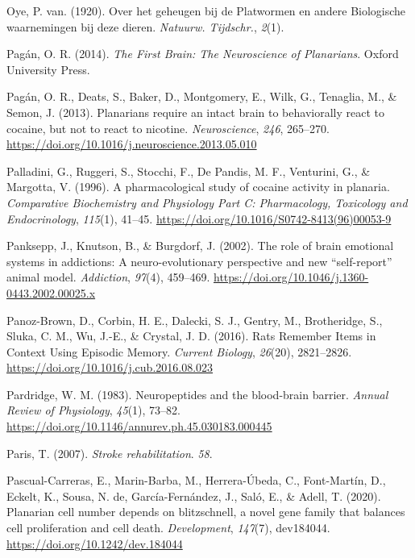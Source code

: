 \documentclass[
  jou,
  floatsintext,
  longtable,
  nolmodern,
  notxfonts,
  notimes,
  donotrepeattitle,
  colorlinks=true,linkcolor=blue,citecolor=blue,urlcolor=blue]{apa7}
\newlength{\cslhangindent}
\newenvironment{CSLReferences}[2] %
 {\begin{list}{}{%
  \setlength{\itemindent}{0pt}
  \setlength{\leftmargin}{0pt}
  \setlength{\parsep}{0pt}
  \ifodd #1
   \setlength{\leftmargin}{\cslhangindent}
   \setlength{\itemindent}{-1\cslhangindent}
  \fi
  \setlength{\itemsep}{#2\baselineskip}}}
 {\end{list}}
\begin{document}
\begin{CSLReferences}{1}{0}
Oye, P. van. (1920). Over het geheugen bij de {Platwormen} en andere
{Biologische} waarnemingen bij deze dieren. \emph{Natuurw. Tijdschr.},
\emph{2}(1).

Pagán, O. R. (2014). \emph{The {First} {Brain}: {The} {Neuroscience} of
{Planarians}}. Oxford University Press.

Pagán, O. R., Deats, S., Baker, D., Montgomery, E., Wilk, G., Tenaglia,
M., \& Semon, J. (2013). Planarians require an intact brain to
behaviorally react to cocaine, but not to react to nicotine.
\emph{Neuroscience}, \emph{246}, 265--270.
\url{https://doi.org/10.1016/j.neuroscience.2013.05.010}

Palladini, G., Ruggeri, S., Stocchi, F., De Pandis, M. F., Venturini,
G., \& Margotta, V. (1996). A pharmacological study of cocaine activity
in planaria. \emph{Comparative Biochemistry and Physiology Part C:
Pharmacology, Toxicology and Endocrinology}, \emph{115}(1), 41--45.
\url{https://doi.org/10.1016/S0742-8413(96)00053-9}

Panksepp, J., Knutson, B., \& Burgdorf, J. (2002). The role of brain
emotional systems in addictions: A neuro-evolutionary perspective and
new {``self-report''} animal model. \emph{Addiction}, \emph{97}(4),
459--469. \url{https://doi.org/10.1046/j.1360-0443.2002.00025.x}

Panoz-Brown, D., Corbin, H. E., Dalecki, S. J., Gentry, M., Brotheridge,
S., Sluka, C. M., Wu, J.-E., \& Crystal, J. D. (2016). Rats {Remember}
{Items} in {Context} {Using} {Episodic} {Memory}. \emph{Current
Biology}, \emph{26}(20), 2821--2826.
\url{https://doi.org/10.1016/j.cub.2016.08.023}

Pardridge, W. M. (1983). Neuropeptides and the blood-brain barrier.
\emph{Annual Review of Physiology}, \emph{45}(1), 73--82.
\url{https://doi.org/10.1146/annurev.ph.45.030183.000445}

Paris, T. (2007). \emph{Stroke rehabilitation}. \emph{58}.

Pascual-Carreras, E., Marin-Barba, M., Herrera-Úbeda, C., Font-Martín,
D., Eckelt, K., Sousa, N. de, García-Fernández, J., Saló, E., \& Adell,
T. (2020). Planarian cell number depends on blitzschnell, a novel gene
family that balances cell proliferation and cell death.
\emph{Development}, \emph{147}(7), dev184044.
\url{https://doi.org/10.1242/dev.184044}


\end{CSLReferences}
\end{document}
